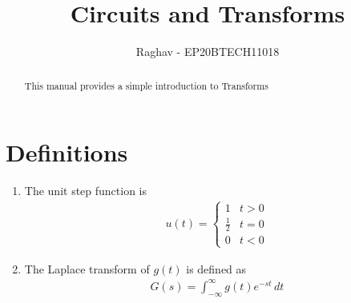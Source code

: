 \documentclass[journal,12pt,twocolumn]{IEEEtran}
\renewcommand\thesection{\arabic{section}}
\begin{document}
	\let\StandardTheFigure\thefigure
	\renewcommand{\thefigure}{\theproblem}
	\renewcommand{\thefigure}{\arabic{section}.\arabic{figure}}
	\makeatletter
	\makeatother
	
	
	\def\putbox#1#2#3{\makebox[0in][l]{\makebox[#1][l]{}\raisebox{\baselineskip}[0in][0in]{\raisebox{#2}[0in][0in]{#3}}}}
	\def\rightbox#1{\makebox[0in][r]{#1}}
	\def\centbox#1{\makebox[0in]{#1}}
	\def\topbox#1{\raisebox{-\baselineskip}[0in][0in]{#1}}
	\def\midbox#1{\raisebox{-0.5\baselineskip}[0in][0in]{#1}}
	
	\vspace{3cm}

	\vspace{3cm}
	
	\title{ 
		Circuits and Transforms
	}
	\author{Raghav - EP20BTECH11018}


\maketitle


\tableofcontents


\renewcommand{\thefigure}{\theenumi}
\renewcommand{\thetable}{\theenumi}



\bigskip

\begin{abstract}
This manual provides a simple introduction to Transforms
\end{abstract}



\section{Definitions}
\begin{enumerate}[label=\arabic*.,ref=\thesection.\theenumi]
\item The unit step function is 
\begin{align}
	u(t) =
	\begin{cases}
		1 & t > 0
		\\
		\frac{1}{2} & t = 0
		\\
		0 & t < 0
	\end{cases}
\end{align}
\item The Laplace transform of $g(t)$ is defined as 
\begin{align}
	G(s) = \int_{-\infty}^{\infty} g(t) e^{-st}\, dt
\end{align}
\end{enumerate}
\end{document}

